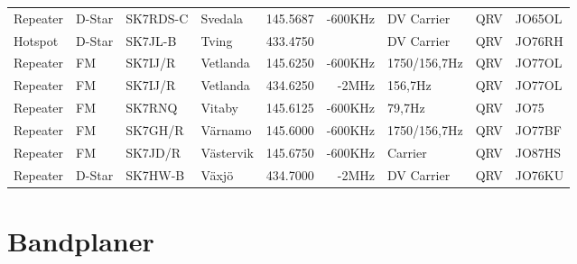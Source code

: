 \begin{landscape}
\begin{longtable}{llllrrlcl}
	Repeater          & D-Star       & SK7RDS-C      & Svedala             &          145.5687 &        -600KHz & DV Carrier      &       QRV       & JO65OL           \\
	Hotspot           & D-Star       & SK7JL-B       & Tving               &          433.4750 &                & DV Carrier      &       QRV       & JO76RH           \\
	Repeater          & FM           & SK7IJ/R       & Vetlanda            &          145.6250 &        -600KHz & 1750/156,7Hz    &       QRV       & JO77OL           \\
	Repeater          & FM           & SK7IJ/R       & Vetlanda            &          434.6250 &          -2MHz & 156,7Hz         &       QRV       & JO77OL           \\
	Repeater          & FM           & SK7RNQ        & Vitaby              &          145.6125 &        -600KHz & 79,7Hz          &       QRV       & JO75             \\
	Repeater          & FM           & SK7GH/R       & Värnamo             &          145.6000 &        -600KHz & 1750/156,7Hz    &       QRV       & JO77BF           \\
	Repeater          & FM           & SK7JD/R       & Västervik           &          145.6750 &        -600KHz & Carrier         &       QRV       & JO87HS           \\
	Repeater          & D-Star       & SK7HW-B       & Växjö               &          434.7000 &          -2MHz & DV Carrier      &       QRV       & JO76KU
\end{longtable}
\normalsize
\section{Bandplaner}

\end{landscape}
